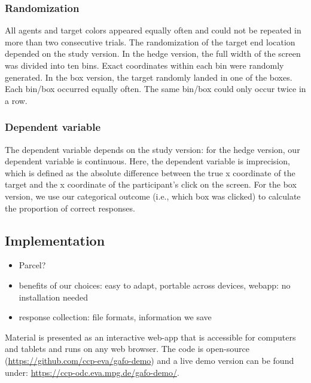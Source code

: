 \documentclass[
  english,
  man,floatsintext]{apa6}
\providecommand{\tightlist}{%
  \setlength{\itemsep}{0pt}\setlength{\parskip}{0pt}}
\begin{document}
\hypertarget{randomization}{%
\subsubsection{Randomization}\label{randomization}}

All agents and target colors appeared equally often and could not be repeated in more than two consecutive trials. The randomization of the target end location depended on the study version. In the hedge version, the full width of the screen was divided into ten bins. Exact coordinates within each bin were randomly generated. In the box version, the target randomly landed in one of the boxes. Each bin/box occurred equally often. The same bin/box could only occur twice in a row.

\hypertarget{dependent-variable}{%
\subsubsection{Dependent variable}\label{dependent-variable}}

The dependent variable depends on the study version: for the hedge version, our dependent variable is continuous. Here, the dependent variable is imprecision, which is defined as the absolute difference between the true x coordinate of the target and the x coordinate of the participant's click on the screen. For the box version, we use our categorical outcome (i.e., which box was clicked) to calculate the proportion of correct responses.

\hypertarget{implementation}{%
\subsection{Implementation}\label{implementation}}

\begin{itemize}
\tightlist
\item
  Parcel?
\item
  benefits of our choices: easy to adapt, portable across devices, webapp: no installation needed
\item
  response collection: file formats, information we save
\end{itemize}

Material is presented as an interactive web-app that is accessible for computers and tablets and runs on any web browser. The code is open-source (\url{https://github.com/ccp-eva/gafo-demo}) and a live demo version can be found under: \url{https://ccp-odc.eva.mpg.de/gafo-demo/}.
\end{document}
